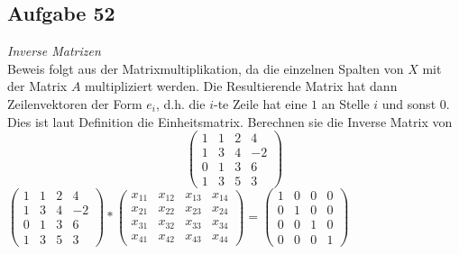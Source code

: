 \documentclass[12pt]{article}
\begin{document}
\subsection*{Aufgabe 52}\textit{Inverse Matrizen}\\
Beweis folgt aus der Matrixmultiplikation, da die einzelnen Spalten von $X$ mit der Matrix $A$ multipliziert werden. Die Resultierende Matrix hat dann Zeilenvektoren der Form $e_i$, d.h. die $i$-te Zeile hat eine $1$ an Stelle $i$ und sonst $0$. Dies ist laut Definition die Einheitsmatrix.
Berechnen sie die Inverse Matrix von
$$\begin{pmatrix}
1 & 1 & 2 & 4 \\ 1 & 3 & 4 & -2 \\
0 & 1 & 3 & 6 \\ 1 & 3 & 5 & 3
\end{pmatrix}$$
$\begin{pmatrix}
1 & 1 & 2 & 4 \\ 1 & 3 & 4 & -2 \\
0 & 1 & 3 & 6 \\ 1 & 3 & 5 & 3
\end{pmatrix}*\begin{pmatrix}
x_{11} & x_{12} & x_{13} & x_{14} \\
x_{21} & x_{22} & x_{23} & x_{24} \\
x_{31} & x_{32} & x_{33} & x_{34} \\
x_{41} & x_{42} & x_{43} & x_{44}
\end{pmatrix} = \begin{pmatrix}
1 & 0 & 0 & 0 \\
0 & 1 & 0 & 0 \\
0 & 0 & 1 & 0 \\
0 & 0 & 0 & 1
\end{pmatrix}$\\
\end{document}
